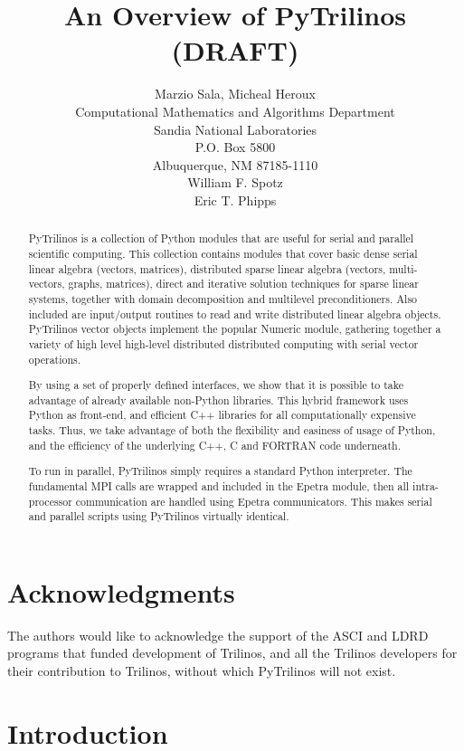 \documentclass[10pt,relax]{SANDreport}
\author{Marzio Sala, Micheal Heroux\\
Computational Mathematics and Algorithms Department \\
Sandia National Laboratories \\
P.O. Box 5800 \\
Albuquerque, NM 87185-1110 \\[10pt]
William F. Spotz \\[10pt]
Eric T. Phipps \\[10pt]
}
\title{An Overview of PyTrilinos (DRAFT)}
\begin{document}
\maketitle

\begin{abstract}
PyTrilinos is a collection of Python modules that are useful for serial and
parallel scientific
computing. This collection contains modules that cover basic
dense serial linear algebra (vectors, matrices), 
distributed sparse linear algebra (vectors, multi-vectors, graphs, matrices), 
direct and iterative solution techniques for sparse linear systems, together with
domain decomposition and multilevel
preconditioners. Also included are input/output routines to read and write
distributed linear algebra objects.
PyTrilinos vector objects implement the popular Numeric module, gathering
together a variety of high level 
high-level distributed distributed computing with serial vector operations.

By using a set of properly defined interfaces, we show that it is possible to
take advantage of already available non-Python libraries. This hybrid framework
uses Python as front-end, and efficient C++ libraries for all computationally
expensive tasks. Thus, we take advantage of both the flexibility and easiness
of usage of Python, and the efficiency of the underlying C++, C and FORTRAN
code underneath. 

To run in parallel, PyTrilinos simply requires a standard Python interpreter.
The fundamental MPI calls are wrapped and included in the Epetra module, then
all intra-processor communication are handled using Epetra communicators. This
makes serial and parallel scripts using PyTrilinos virtually identical.
\end{abstract}

\clearpage
\section*{Acknowledgments}
The authors would like to acknowledge the support of the ASCI and LDRD
programs that funded development of Trilinos, and all the Trilinos developers
for their contribution to Trilinos, without which PyTrilinos will not exist.

\medskip

\SANDmain
\tableofcontents
\newpage

\section{Introduction}
\label{chap:introduction}
\end{document}
